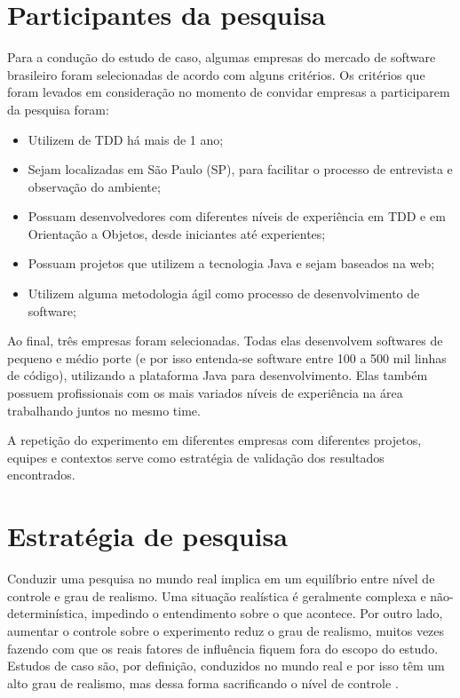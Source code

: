 \section{Participantes da pesquisa}
\label{sec:planejamento-participantes}

Para a condução do estudo de caso, algumas empresas do mercado de software
brasileiro foram selecionadas de acordo com alguns critérios.
Os critérios que foram levados em consideração no momento de convidar empresas a
participarem da pesquisa foram:

\begin{itemize}
	\item Utilizem de TDD há mais de 1 ano;

	\item Sejam localizadas em São Paulo (SP), para facilitar o processo de
	entrevista e observação do ambiente;

	\item Possuam desenvolvedores com diferentes níveis de experiência em TDD e em 
	Orientação a Objetos, desde iniciantes até experientes;

	\item Possuam projetos que utilizem a tecnologia Java e sejam baseados na web;

	\item Utilizem alguma metodologia ágil como processo de desenvolvimento de
	software;
\end{itemize}

Ao final, três empresas foram selecionadas. Todas elas desenvolvem softwares de
pequeno e médio porte (e por isso entenda-se software entre 100 a 500 mil linhas
de código), utilizando a plataforma Java para desenvolvimento. Elas também 
possuem profissionais com os mais variados níveis de experiência na área 
trabalhando juntos no mesmo time.

A repetição do experimento em diferentes empresas com diferentes projetos,
equipes e contextos serve como estratégia de validação dos resultados
encontrados.

\section{Estratégia de pesquisa} 
\label{sec:planejamento-estrategia}

Conduzir uma pesquisa no mundo real implica em um equilíbrio entre nível de
controle e grau de realismo. Uma situação realística é geralmente complexa e 
não-determinística, impedindo o entendimento sobre o que acontece. Por outro
lado, aumentar o controle sobre o experimento reduz o grau de realismo, muitos
vezes fazendo com que os reais fatores de influência fiquem fora do escopo do 
estudo. Estudos de caso são, por definição, conduzidos no mundo real e por isso 
têm um alto grau de realismo, mas dessa forma sacrificando o nível de  controle
\cite{guidelines-case-study}.

